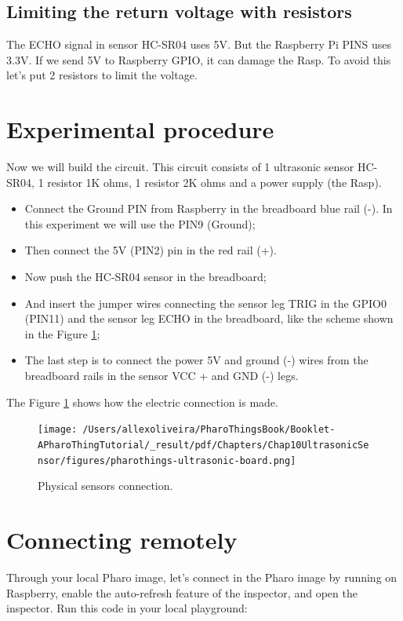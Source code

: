 \documentclass[10pt,twoside,english]{_support/latex/sbabook/sbabook}
\begin{document}
\subsection{Limiting the return voltage with resistors}
The ECHO signal in sensor HC-SR04 uses 5V. But the Raspberry Pi PINS uses 3.3V. If we send 5V to Raspberry GPIO, it can damage the Rasp. To avoid this let's put 2 resistors to limit the voltage.  
\section{Experimental procedure}
Now we will build the circuit. This circuit consists of 1 ultrasonic sensor HC-SR04, 1 resistor 1K ohms, 1 resistor 2K ohms and a power supply (the Rasp).

\begin{itemize}
\item Connect the Ground PIN from Raspberry in the breadboard blue rail (-). In this experiment we will use the PIN9 (Ground);
\item Then connect the 5V (PIN2) pin in the red rail (+). 
\item Now push the HC-SR04 sensor in the breadboard;
\item And insert the jumper wires connecting the sensor leg TRIG in the GPIO0 (PIN11) and the sensor leg ECHO in the breadboard, like the scheme shown in the Figure \ref{physicalSonicSensors};
\item The last step is to connect the power 5V and ground (-) wires from the breadboard rails in the sensor VCC + and GND (-) legs.
\end{itemize}

The Figure \ref{physicalSonicSensors} shows how the electric connection is made.


\begin{figure}

\begin{center}
\texttt{[image: /Users/allexoliveira/PharoThingsBook/Booklet-APharoThingTutorial/\_result/pdf/Chapters/Chap10UltrasonicSensor/figures/pharothings-ultrasonic-board.png]}\caption{Physical sensors connection.\label{physicalSonicSensors}}\end{center}
\end{figure}

\section{Connecting remotely}
Through your local Pharo image, let’s connect in the Pharo image by running on Raspberry, enable the auto-refresh feature of the inspector, and open the inspector.
Run this code in your local playground:
\end{document}
